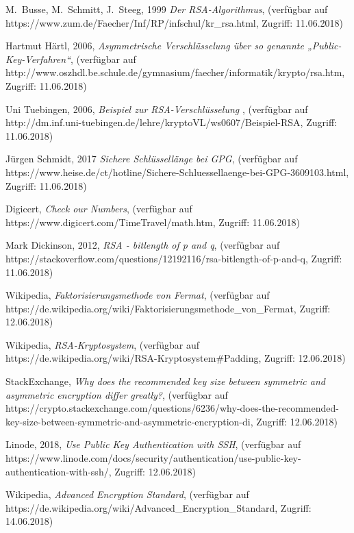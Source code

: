 \documentclass[conference,10pt,a4paper,twocolumn]{IEEEtran}
\begin{document}
\begin{thebibliography}{1}
M.~Busse, M.~Schmitt, J.~Steeg, 1999 \emph{Der RSA-Algorithmus}, (verfügbar auf https://www.zum.de/Faecher/Inf/RP/infschul/kr{\_}rsa.html, Zugriff: 11.06.2018)

Hartmut Härtl, 2006, \emph{Asymmetrische Verschlüsselung
über so genannte „Public-Key-Verfahren“}, (verfügbar auf http://www.oszhdl.be.schule.de/gymnasium/faecher/informatik/krypto/rsa.htm, Zugriff: 11.06.2018)

Uni Tuebingen, 2006, \emph{Beispiel zur RSA-Verschlüsselung }, (verfügbar auf http://dm.inf.uni-tuebingen.de/lehre/kryptoVL/ws0607/Beispiel-RSA, Zugriff: 11.06.2018)

Jürgen Schmidt, 2017 \emph{Sichere Schlüssellänge bei GPG}, (verfügbar auf https://www.heise.de/ct/hotline/Sichere-Schluessellaenge-bei-GPG-3609103.html, Zugriff: 11.06.2018)

Digicert, \emph{Check our Numbers}, (verfügbar auf https://www.digicert.com/TimeTravel/math.htm, Zugriff: 11.06.2018)

Mark Dickinson, 2012, \emph{RSA - bitlength of p and q}, (verfügbar auf https://stackoverflow.com/questions/12192116/rsa-bitlength-of-p-and-q, Zugriff: 11.06.2018)

Wikipedia, \emph{Faktorisierungsmethode von Fermat}, (verfügbar auf https://de.wikipedia.org/wiki/Faktorisierungsmethode{\_}von{\_}Fermat, Zugriff: 12.06.2018)

Wikipedia, \emph{RSA-Kryptosystem}, (verfügbar auf https://de.wikipedia.org/wiki/RSA-Kryptosystem{\#}Padding, Zugriff: 12.06.2018)

StackExchange, \emph{Why does the recommended key size between symmetric and asymmetric encryption differ greatly?}, (verfügbar auf https://crypto.stackexchange.com/questions/6236/why-does-the-recommended-key-size-between-symmetric-and-asymmetric-encryption-di, Zugriff: 12.06.2018)

Linode, 2018, \emph{Use Public Key Authentication with SSH}, (verfügbar auf https://www.linode.com/docs/security/authentication/use-public-key-authentication-with-ssh/, Zugriff: 12.06.2018)

Wikipedia, \emph{Advanced Encryption Standard}, (verfügbar auf https://de.wikipedia.org/wiki/Advanced{\_}Encryption{\_}Standard, Zugriff: 14.06.2018)


\end{thebibliography}
\end{document}
